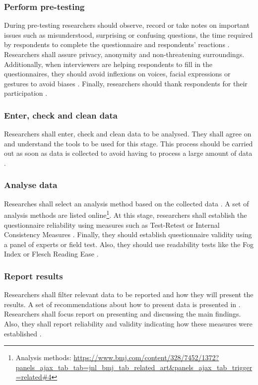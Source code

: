 \subsubsection{Perform pre-testing}
During pre-testing researchers should observe, record or take notes on important issues such as misunderstood, surprising or confusing questions, the time required by respondents to complete the questionnaire and respondents' reactions \cite{Boynton2004}. Researchers shall assure privacy, anonymity and non-threatening surroundings. Additionally, when interviewers are helping respondents to fill in the questionnaires, they should avoid inflexions on voices, facial expressions or gestures to avoid biases \cite{Boynton2004b}.
Finally, researchers should thank respondents for their participation \cite{Diem}.

\subsubsection{Enter, check and clean data}
Researchers shall enter, check and clean data to be analysed. They shall agree on and understand the tools to be used for this stage. This process should be carried out as soon as data is collected to avoid having to process a large amount of data \cite{Boynton2004}.

\subsubsection{Analyse data}
Researches shall select an analysis method based on the collected data \cite{Boynton2004,Diem}. A set of analysis methods are listed online\footnote{Analysis methods: \url{https://www.bmj.com/content/328/7452/1372?panels_ajax_tab_tab=jnl_bmj_tab_related_art&panels_ajax_tab_trigger=related\#4}}. At this stage, researchers shall establish the questionnaire reliability using measures such as Test-Retest or Internal Consistency Measures \cite{Radhakrishna2007,Diem}. Finally, they should establish questionnaire validity using a panel of experts or field test. Also, they should use readability tests like the Fog Index or Flesch Reading Ease \cite{Radhakrishna2007}.

\subsubsection{Report results}
Researchers shall filter relevant data to be reported \cite{Boynton2004,Diem} and how they will present the results. A set of recommendations about how to present data is presented in \cite{Boynton2004}. Researchers shall focus report on presenting and discussing the main findings. Also, they shall report reliability and validity indicating how these measures were established \cite{Radhakrishna2007}.


